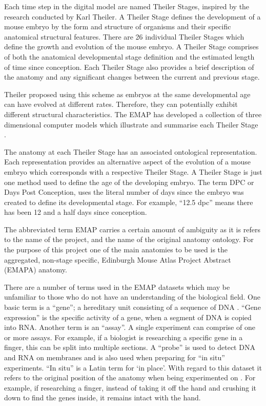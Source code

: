 Each time step in the digital model are named Theiler Stages, inspired by the research conducted by Karl Theiler. A Theiler Stage defines the development of a mouse embryo by the form and structure of organisms and their specific anatomical structural features. There are 26 individual Theiler Stages which define the growth and evolution of the mouse embryo. A Theiler Stage comprises of both the anatomical developmental stage definition and the estimated length of time since conception. Each Theiler Stage also provides a brief description of the anatomy and any significant changes between the current and previous stage.

Theiler proposed using this scheme as embryos at the same developmental age can have evolved at different rates. Therefore, they can potentially exhibit different structural characteristics. The EMAP has developed a collection of three dimensional computer models which illustrate and summarise each Theiler Stage \cite{emap}.

The anatomy at each Theiler Stage has an associated ontological representation. Each representation provides an alternative aspect of the evolution of a mouse embryo which corresponds with a respective Theiler Stage. A Theiler Stage is just one method used to define the age of the developing embryo. The term DPC or Days Post Conception, uses the literal number of days since the embryo was created to define its developmental stage. For example, ``12.5 dpc'' means there has been 12 and a half days since conception.

The abbreviated term EMAP carries a certain amount of ambiguity as it is refers to the name of the project, and the name of the original anatomy ontology. For the purpose of this project one of the main anatomies to be used is the aggregated, non-stage specific, Edinburgh Mouse Atlas Project Abstract (EMAPA) anatomy.

There are a number of terms used in the EMAP datasets which may be unfamiliar to those who do not have an understanding of the biological field. One basic term is a ``gene''; a hereditary unit consisting of a sequence of DNA \cite{emap}. ``Gene expression'' is the specific activity of a gene, when a segment of DNA is copied into RNA. Another term is an ``assay''. A single experiment can comprise of one or more assays. For example, if a biologist is researching a specific gene in a finger, this can be split into multiple sections. A ``probe'' is used to detect DNA and RNA on membranes and is also used when preparing for ``in situ'' experiments. ``In situ'' is a Latin term for `in place'. With regard to this dataset it refers to the original position of the anatomy when being experimented on \cite{emap}. For example, if researching a finger, instead of taking it off the hand and crushing it down to find the genes inside, it remains intact with the hand.

